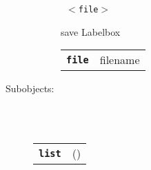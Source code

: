 \begin{description}
\begin{description}
       \texttt{ $<$file$>$} \

        save Labelbox

      \begin{tabular}{ll}
 \texttt{\textbf{file}} &  filename  \\
      \end{tabular}
    \end{description}

  \item[Subobjects:] \hfill \\
\ 
    \begin{tabular}{ll}
      \texttt{\textbf{list}} & (\Jref{module}{List}) \\
    \end{tabular}
\vspace{3mm}

\end{description}

